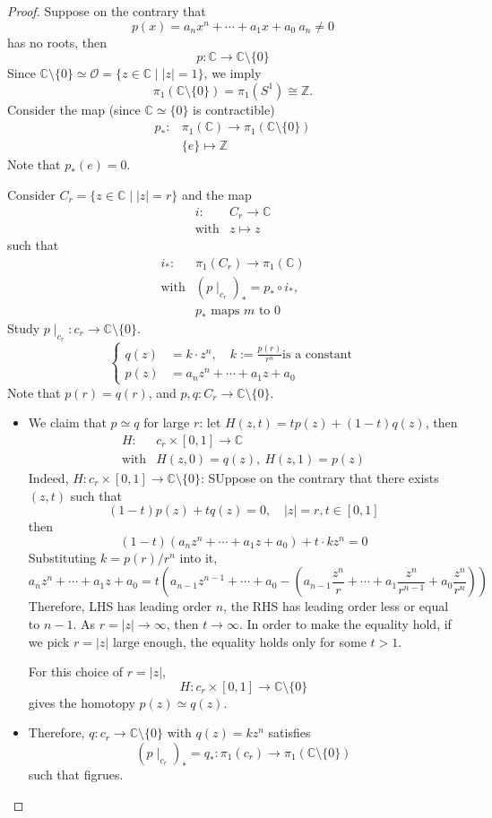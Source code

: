 \begin{proof}
Suppose on the contrary that 
\[
p(x)=a_nx^n+\cdots+a_1x+a_0\ a_n\ne0
\]
has no roots, then 
\[
p:\mathbb{C}\to\mathbb{C}\setminus\{0\}
\]
Since $\mathbb{C}\setminus\{0\}\simeq\mathcal{O}=\{z\in\mathbb{C}\mid|z|=1\}$, we imply
\[
\pi_1(\mathbb{C}\setminus\{0\})=\pi_1(S^1)\cong\mathbb{Z}.
\]
Consider the map (since $\mathbb{C}\simeq\{0\}$ is contractible)
\[
\begin{array}{ll}
p_*:&\pi_1(\mathbb{C})\to \pi_1(\mathbb{C}\setminus\{0\})\\
&\{e\}\mapsto\mathbb{Z}
\end{array}
\]
Note that $p_*(e)=0$.

Consider $C_r=\{z\in\mathbb{C}\mid |z|=r\}$ and the map
\[
\begin{array}{ll}
i:&C_r\to\mathbb{C}\\
\text{with}&z\mapsto z
\end{array}
\]
such that
\[
\begin{array}{ll}
i_*:&\pi_1(C_r)\to\pi_1(\mathbb{C})\\
\text{with}&(p\mid_{c_r})_* = p_*\circ i_*,\\
&\text{$p_*$ maps $m$ to $0$}
\end{array}
\]
Study $p\mid_{c_r}:c_r\to\mathbb{C}\setminus\{0\}$.
\[
\left\{
\begin{aligned}
q(z)&=k\cdot z^n,\quad k:=\frac{p(r)}{r^n}\text{is a constant}\\
p(z)&=a_nz^n+\cdots+a_1z+a_0
\end{aligned}
\right.
\]
Note that $p(r)=q(r)$, and $p,q:C_r\to\mathbb{C}\setminus\{0\}$.
\begin{itemize}
\item
We claim that $p\simeq q$ for large $r$:
let $H(z,t)=tp(z)+(1-t)q(z)$, then 
\[
\begin{array}{ll}
H:&c_r\times[0,1]\to\mathbb{C}\\
\text{with}&H(z,0)=q(z), \ H(z,1) = p(z)
\end{array}
\]
Indeed, $H:c_r\times[0,1]\to\mathbb{C}\setminus\{0\}$:
SUppose on the contrary that there exists $(z,t)$ such that
\[
(1-t)p(z)+tq(z)=0,\quad |z|=r, t\in[0,1]
\]
then 
\[
(1-t)(a_nz^n+\cdots+a_1z+a_0)+t\cdot kz^n=0
\]
Substituting $k=p(r)/r^n$ into it,
\[
a_nz^n+\cdots+a_1z+a_0
=
t(a_{n-1}z^{n-1}+\cdots+a_0 - (a_{n-1}\frac{z^n}{r}+\cdots+a_1\frac{z^n}{r^{n-1}}+a_0\frac{z^n}{r^n}))
\]
Therefore, LHS has leading order $n$, the RHS has leading order less or equal to $n-1$.
As $r=|z|\to\infty$, then $t\to\infty$.
In order to make the equality hold, if we pick $r=|z|$ large enough, the equality holds only for some $t>1$.

For this choice of $r=|z|$, 
\[
H:c_r\times[0,1]\to\mathbb{C}\setminus\{0\}
\]
gives the homotopy $p(z)\simeq q(z)$.
\item
Therefore, $q:c_r\to\mathbb{C}\setminus\{0\}$ with $q(z)=kz^n$ satisfies 
\[
(p\mid_{c_r})_*=q_*:\pi_1(c_r)\to\pi_1(\mathbb{C}\setminus\{0\})
\]
such that 
figrues.
\end{itemize}
\end{proof}













